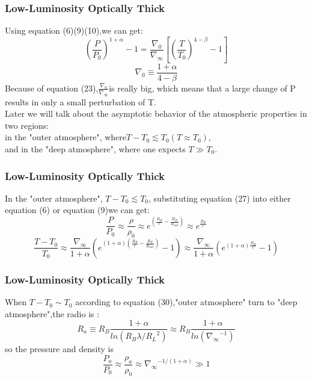 \documentclass{beamer}
\begin{document}
\begin{frame}
\frametitle{Low-Luminosity Optically Thick}
Using equation (6)(9)(10),we can get:
\begin{equation}
{(\frac{P}{P_0})}^{1+\alpha}-1=\frac{\nabla_0}{\nabla_\infty}[{(\frac{T}{T_0})}^{4-\beta}-1]
\end{equation}
\begin{equation}
\nabla_0 \equiv \frac{1+\alpha}{4-\beta}
\end{equation}
Because of equation (23),$\frac{\nabla_0}{\nabla_\infty}$is really big, which means that a large change of P results in only a small perturbation of T.\\
Later we will talk about the asymptotic behavior of the atmospheric properties in two regions: \\
in the "outer atmosphere", where$ T-T_0\lesssim T_0(T \approx T_0)$, \\
and in the "deep atmosphere", where one expects $T \gg T_0$.
\end{frame}

\begin{frame}
\frametitle{Low-Luminosity Optically Thick}
In the "outer atmosphere", $ T-T_0\lesssim T_0$, substituting equation (27) into either equation (6) or equation (9)we can get:
\begin{equation}
\frac{P}{P_0}\approx\frac{\rho}{\rho_0}\approx e^{(\frac{R_B}{r}-\frac{R_B}{R_{out}})}\approx e^{\frac{R_B}{r}}
\end{equation}
\begin{equation}
\frac{T-T_0}{T_0}\approx \frac{\nabla_{\infty}}{1+\alpha}(e^{(1+\alpha)(\frac{R_B}{r}-\frac{R_B}{R_{out}})}-1)\approx \frac{\nabla_{\infty}}{1+\alpha}(e^{(1+\alpha)\frac{R_B}{r}}-1)
\end{equation}
\end{frame}

\begin{frame}
\frametitle{Low-Luminosity Optically Thick}
When $T-T_0 \sim T_0$ according to equation (30),"outer atmosphere" turn to "deep atmosphere",the radio is :
\begin{equation}
R_a\equiv R_B\frac{1+\alpha}{ln(R_B \lambda/{R_L}^2)}\approx R_B \frac{1+\alpha}{ln({\nabla_{\infty}}^{-1})}
\end{equation}
so the pressure and density is
\begin{equation}
\frac{P_a}{P_0}\approx\frac{\rho_a}{\rho_0}\approx {\nabla_{\infty}}^{-1/(1+\alpha)}\gg 1
\end{equation}
\end{frame}
\end{document}
